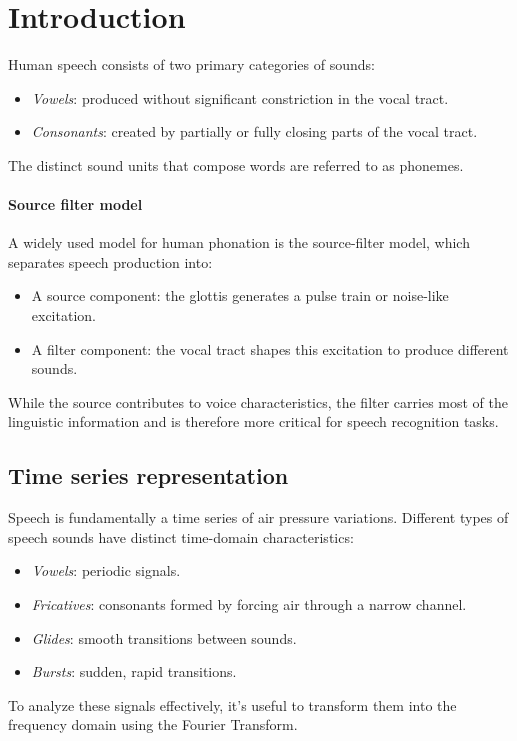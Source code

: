 \section{Introduction}

Human speech consists of two primary categories of sounds:
\begin{itemize}
    \item \textit{Vowels}: produced without significant constriction in the vocal tract.
    \item \textit{Consonants}: created by partially or fully closing parts of the vocal tract.
\end{itemize}
The distinct sound units that compose words are referred to as phonemes.

\paragraph*{Source filter model}
A widely used model for human phonation is the source-filter model, which separates speech production into:
\begin{itemize}
    \item A source component: the glottis generates a pulse train or noise-like excitation.
    \item A filter component: the vocal tract shapes this excitation to produce different sounds.
\end{itemize}
\noindent While the source contributes to voice characteristics, the filter carries most of the linguistic information and is therefore more critical for speech recognition tasks.

\subsection{Time series representation}
Speech is fundamentally a time series of air pressure variations.
Different types of speech sounds have distinct time-domain characteristics:
\begin{itemize}
    \item \textit{Vowels}: periodic signals.
    \item \textit{Fricatives}: consonants formed by forcing air through a narrow channel.
    \item \textit{Glides}: smooth transitions between sounds.
    \item \textit{Bursts}: sudden, rapid transitions.
\end{itemize}
\noindent To analyze these signals effectively, it's useful to transform them into the frequency domain using the Fourier Transform.

